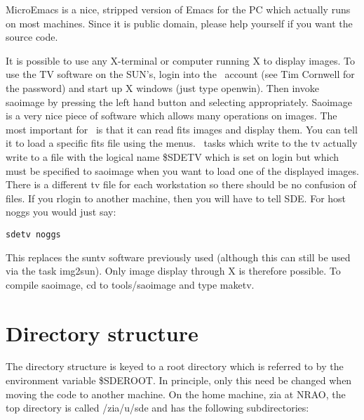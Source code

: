 MicroEmacs is a nice, stripped version of Emacs for the PC which
actually runs on most machines. Since it is public domain, please
help yourself if you want the source code. 

It is possible to use any X-terminal or computer running X to display
images. To use the TV software on the SUN's, login into the \sde\ account
(see Tim Cornwell for the password) and start up X windows (just type
openwin). Then invoke saoimage by pressing the left hand button
and selecting appropriately. Saoimage is a very nice piece of software
which allows many operations on images. The most important for
\sde\ is that it can read fits images and display them. You can
tell it to load a specific fits file using the menus. \sde\ tasks
which write to the tv actually write to a file with the logical
name \$SDETV which is set on login but which must be specified to
saoimage when you want to load one of the displayed images.
There is a different tv file for each workstation so there
should be no confusion of files. If you rlogin to another machine, then
you will have to tell SDE. For host noggs you would just say:

	{\tt sdetv noggs}

This replaces the suntv software previously used (although this can
still be used via the task img2sun). Only image display through X is
therefore possible. To compile saoimage, cd to tools/saoimage and type
maketv.

\newpage
\appendix

\section{Directory structure}

The directory structure is keyed to a root directory which is 
referred to by the environment variable \$SDEROOT. In principle, only
this need be changed when moving the code to another machine.
On the home machine, zia at NRAO, the top directory is called
/zia/u/sde and has the following subdirectories:

